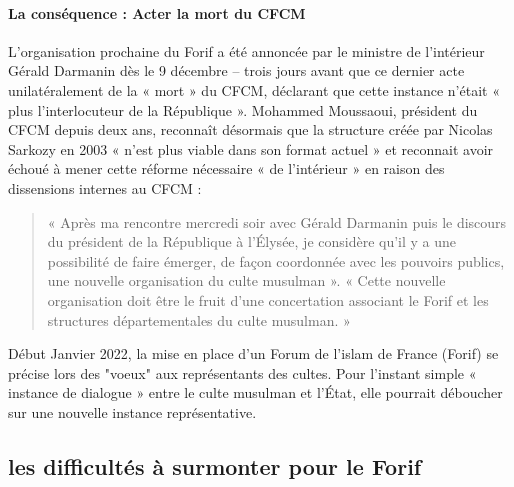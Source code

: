 \paragraph{La conséquence : Acter la mort du CFCM}
L’organisation prochaine du Forif a été annoncée par le ministre de l’intérieur Gérald Darmanin dès le 9 décembre – trois jours avant que ce dernier acte unilatéralement de la « mort » du CFCM, déclarant que cette instance n’était « plus l’interlocuteur de la République ».  Mohammed Moussaoui, président du CFCM depuis deux ans, reconnaît désormais que la structure créée par Nicolas Sarkozy en 2003 « n’est plus viable dans son format actuel » et reconnait avoir échoué à mener cette réforme nécessaire « de l’intérieur » en raison des dissensions internes au CFCM : 

\begin{quote}
    « Après ma rencontre mercredi soir avec Gérald Darmanin puis le discours du président de la République à l’Élysée, je considère qu’il y a une possibilité de faire émerger, de façon coordonnée avec les pouvoirs publics, une nouvelle organisation du culte musulman ». 
    « Cette nouvelle organisation doit être le fruit d’une concertation associant le Forif et les structures départementales du culte musulman. »
\end{quote}




Début Janvier 2022,  la mise en place d’un Forum de l’islam de France (Forif) se précise lors des "voeux" aux représentants des cultes. Pour l’instant simple « instance de dialogue » entre le culte musulman et l’État, elle pourrait déboucher sur une nouvelle instance représentative.

\subsection*{les difficultés à surmonter pour le Forif}

